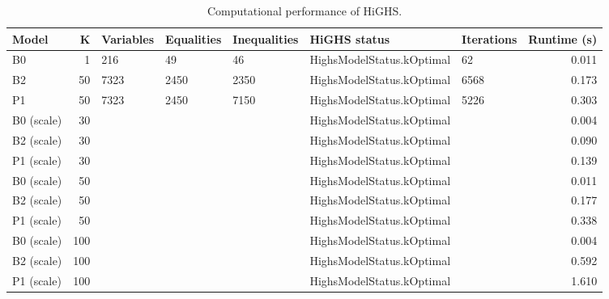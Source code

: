 \begin{table}
\caption{Computational performance of HiGHS.}
\label{tab:compute}
\begin{tabular}{lrlllllr}
\toprule
Model & K & Variables & Equalities & Inequalities & HiGHS status & Iterations & Runtime (s) \\
\midrule
B0 & 1 & 216 & 49 & 46 & HighsModelStatus.kOptimal & 62 & 0.011 \\
B2 & 50 & 7323 & 2450 & 2350 & HighsModelStatus.kOptimal & 6568 & 0.173 \\
P1 & 50 & 7323 & 2450 & 7150 & HighsModelStatus.kOptimal & 5226 & 0.303 \\
B0 (scale) & 30 &  &  &  & HighsModelStatus.kOptimal &  & 0.004 \\
B2 (scale) & 30 &  &  &  & HighsModelStatus.kOptimal &  & 0.090 \\
P1 (scale) & 30 &  &  &  & HighsModelStatus.kOptimal &  & 0.139 \\
B0 (scale) & 50 &  &  &  & HighsModelStatus.kOptimal &  & 0.011 \\
B2 (scale) & 50 &  &  &  & HighsModelStatus.kOptimal &  & 0.177 \\
P1 (scale) & 50 &  &  &  & HighsModelStatus.kOptimal &  & 0.338 \\
B0 (scale) & 100 &  &  &  & HighsModelStatus.kOptimal &  & 0.004 \\
B2 (scale) & 100 &  &  &  & HighsModelStatus.kOptimal &  & 0.592 \\
P1 (scale) & 100 &  &  &  & HighsModelStatus.kOptimal &  & 1.610 \\
\bottomrule
\end{tabular}
\end{table}
